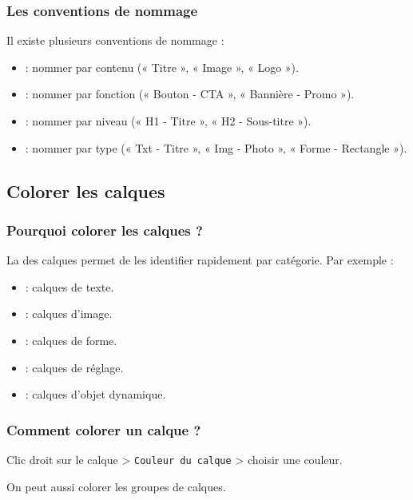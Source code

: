 \subsubsection{Les conventions de nommage}

Il existe plusieurs conventions de nommage :

\begin{itemize}
    \item {} : nommer par contenu (« Titre », « Image », « Logo »).
    \item {} : nommer par fonction (« Bouton - CTA », « Bannière - Promo »).
    \item {} : nommer par niveau (« H1 - Titre », « H2 - Sous-titre »).
    \item {} : nommer par type (« Txt - Titre », « Img - Photo », « Forme - Rectangle »).
\end{itemize}

\subsection{Colorer les calques}

\subsubsection{Pourquoi colorer les calques ?}

La  des calques permet de les identifier rapidement par catégorie. Par exemple :

\begin{itemize}
    \item {} : calques de texte.
    \item {} : calques d'image.
    \item {} : calques de forme.
    \item {} : calques de réglage.
    \item {} : calques d'objet dynamique.
\end{itemize}

\subsubsection{Comment colorer un calque ?}

Clic droit sur le calque > \texttt{Couleur du calque} > choisir une couleur.

On peut aussi colorer les groupes de calques.

